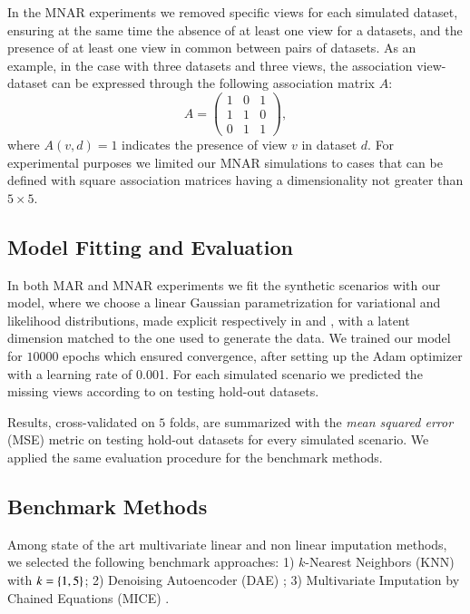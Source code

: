 In the MNAR experiments we removed specific views for each simulated dataset, ensuring at the same time the absence of at least one view for a datasets, and the presence of at least one view in common between pairs of datasets.
As an example, in the case with three datasets and three views, the association view-dataset can be expressed through the following association matrix $A$:
\begin{equation}
A = 
\begin{pmatrix}
1 & 0 & 1 \\
1 & 1 & 0 \\
0 & 1 & 1 
\end{pmatrix},
\end{equation}
where $A(v,d)=1$ indicates the presence of view $v$ in dataset $d$.
For experimental purposes we limited our MNAR simulations to cases that can be defined with square association matrices having a dimensionality not greater than $5\times5$.

\subsection{Model Fitting and Evaluation}
In both MAR and MNAR experiments we fit the synthetic scenarios with our model, where we choose a linear Gaussian parametrization for variational and likelihood distributions, made explicit respectively in  and , with a latent dimension matched to the one used to generate the data.
We trained our model for $10000$ epochs which ensured convergence, after setting up the Adam optimizer with a learning rate of 0.001.
For each simulated scenario we predicted the missing views according to  on testing hold-out datasets.

Results, cross-validated on $5$ folds, are summarized with the \textit{mean squared error} (MSE) metric on testing hold-out datasets for every simulated scenario.
We applied the same evaluation procedure for the benchmark methods.

\subsection{Benchmark Methods}
Among state of the art multivariate linear and non linear imputation methods, we selected the following benchmark approaches:
1) $k$-Nearest Neighbors (KNN) with $k=\left\{1, 5\right\}$;
2) Denoising Autoencoder (DAE) \citep{dae};
3) Multivariate Imputation by Chained Equations (MICE) \citep{Vanbuuren2000}.


